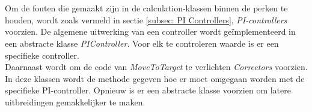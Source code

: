 \\
\\
Om de fouten die gemaakt zijn in de calculation-klassen binnen de perken te houden, wordt zoals vermeld in sectie \ref{subsec: PI Controllers}, \textit{PI-controllers} voorzien. De algemene uitwerking van een controller wordt geïmplementeerd in een abstracte klasse \textit{PIController}. Voor elk te controleren waarde is er een specifieke controller. 
\\
Daarnaast wordt om de code van \textit{MoveToTarget} te verlichten \textit{Correctors} voorzien. In deze klassen wordt de methode gegeven hoe er moet omgegaan worden met de specifieke PI-controller. Opnieuw is er een abstracte klasse voorzien om latere uitbreidingen gemakkelijker te maken. 
\\
\\
